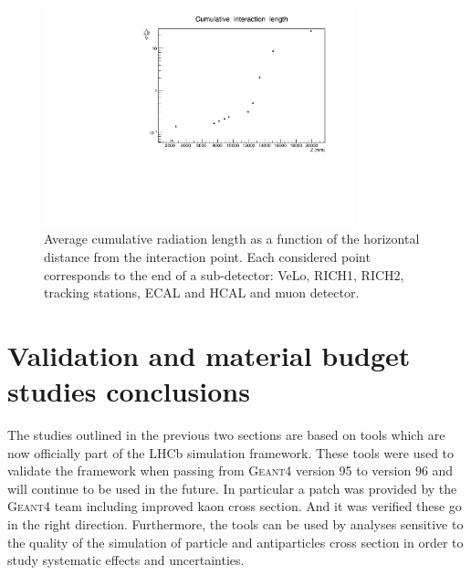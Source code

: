 \begin{center}
\begin{figure}[h!]
\centering \includegraphics[width=0.8\textwidth]{Detector/figs/validation/radlenght/cuminterLength_vs_Z.pdf}
\caption{Average cumulative radiation length as a function of the horizontal 
distance from the interaction point. Each considered point corresponds to the end of a sub-detector:
VeLo, RICH1, RICH2, tracking stations, ECAL and HCAL and muon detector. 
}
\label{fig:cumradlZ}
\end{figure}
\end{center}

\section{Validation and material budget studies conclusions}
\label{sec:radlength_conlsusions}
The studies outlined in the previous two sections are based on tools which are now officially 
part of the LHCb simulation framework. These tools were used to validate the framework when 
passing from \textsc{Geant4} version 95 to version 96 and will continue to be used in the future.
In particular a patch was provided by the \textsc{Geant4} team including
improved kaon cross section. And it was verified these go in the right direction.
Furthermore, the tools can be used by analyses sensitive to the quality of the simulation 
of particle and antiparticles cross section in order to study systematic effects and uncertainties.



